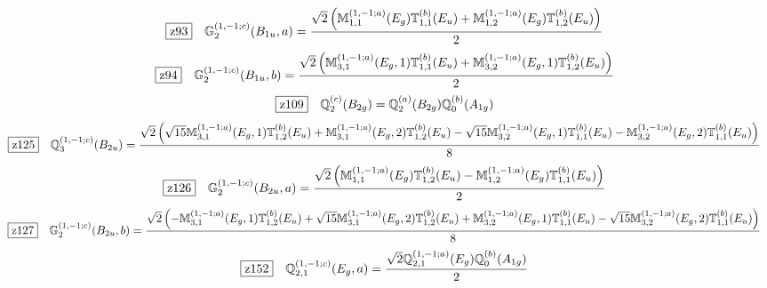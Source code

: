 \documentclass[fleqn,10pt,landscape]{jsarticle}
\begin{document}
\begin{dmath*}
\hspace*{3mm}\fbox{z93}\quad \mathbb{G}_{2}^{(1,-1;c)}(B_{1u},a)=\frac{\sqrt{2} \left(\mathbb{M}_{1,1}^{(1,-1;a)}(E_{g}) \mathbb{T}_{1,1}^{(b)}(E_{u}) + \mathbb{M}_{1,2}^{(1,-1;a)}(E_{g}) \mathbb{T}_{1,2}^{(b)}(E_{u})\right)}{2}
\end{dmath*}
\begin{dmath*}
\hspace*{3mm}\fbox{z94}\quad \mathbb{G}_{2}^{(1,-1;c)}(B_{1u},b)=\frac{\sqrt{2} \left(\mathbb{M}_{3,1}^{(1,-1;a)}(E_{g},1) \mathbb{T}_{1,1}^{(b)}(E_{u}) + \mathbb{M}_{3,2}^{(1,-1;a)}(E_{g},1) \mathbb{T}_{1,2}^{(b)}(E_{u})\right)}{2}
\end{dmath*}
\begin{dmath*}
\hspace*{3mm}\fbox{z109}\quad \mathbb{Q}_{2}^{(c)}(B_{2g})=\mathbb{Q}_{2}^{(a)}(B_{2g}) \mathbb{Q}_{0}^{(b)}(A_{1g})
\end{dmath*}
\begin{dmath*}
\hspace*{3mm}\fbox{z125}\quad \mathbb{Q}_{3}^{(1,-1;c)}(B_{2u})=\frac{\sqrt{2} \left(\sqrt{15} \mathbb{M}_{3,1}^{(1,-1;a)}(E_{g},1) \mathbb{T}_{1,2}^{(b)}(E_{u}) + \mathbb{M}_{3,1}^{(1,-1;a)}(E_{g},2) \mathbb{T}_{1,2}^{(b)}(E_{u}) - \sqrt{15} \mathbb{M}_{3,2}^{(1,-1;a)}(E_{g},1) \mathbb{T}_{1,1}^{(b)}(E_{u}) - \mathbb{M}_{3,2}^{(1,-1;a)}(E_{g},2) \mathbb{T}_{1,1}^{(b)}(E_{u})\right)}{8}
\end{dmath*}
\begin{dmath*}
\hspace*{3mm}\fbox{z126}\quad \mathbb{G}_{2}^{(1,-1;c)}(B_{2u},a)=\frac{\sqrt{2} \left(\mathbb{M}_{1,1}^{(1,-1;a)}(E_{g}) \mathbb{T}_{1,2}^{(b)}(E_{u}) - \mathbb{M}_{1,2}^{(1,-1;a)}(E_{g}) \mathbb{T}_{1,1}^{(b)}(E_{u})\right)}{2}
\end{dmath*}
\begin{dmath*}
\hspace*{3mm}\fbox{z127}\quad \mathbb{G}_{2}^{(1,-1;c)}(B_{2u},b)=\frac{\sqrt{2} \left(- \mathbb{M}_{3,1}^{(1,-1;a)}(E_{g},1) \mathbb{T}_{1,2}^{(b)}(E_{u}) + \sqrt{15} \mathbb{M}_{3,1}^{(1,-1;a)}(E_{g},2) \mathbb{T}_{1,2}^{(b)}(E_{u}) + \mathbb{M}_{3,2}^{(1,-1;a)}(E_{g},1) \mathbb{T}_{1,1}^{(b)}(E_{u}) - \sqrt{15} \mathbb{M}_{3,2}^{(1,-1;a)}(E_{g},2) \mathbb{T}_{1,1}^{(b)}(E_{u})\right)}{8}
\end{dmath*}
\begin{dmath*}
\hspace*{3mm}\fbox{z152}\quad \mathbb{Q}_{2,1}^{(1,-1;c)}(E_{g},a)=\frac{\sqrt{2} \mathbb{Q}_{2,1}^{(1,-1;a)}(E_{g}) \mathbb{Q}_{0}^{(b)}(A_{1g})}{2}
\end{dmath*}
\end{document}
